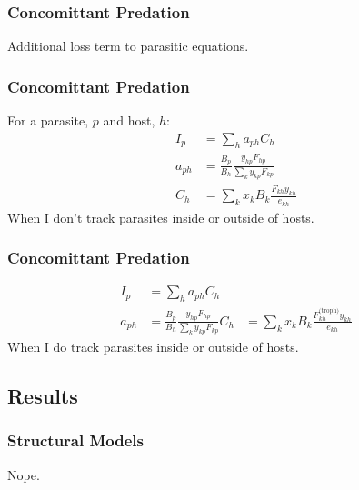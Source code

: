 \documentclass{beamer}
\begin{document}
\begin{frame}
\frametitle{Concomittant Predation}


Additional loss term to parasitic equations.

\end{frame}

\begin{frame}
\frametitle{Concomittant Predation}
For a parasite, $p$ and host, $h$:
\begin{align*}
I_p & = \sum_h a_{ph}C_h\\
a_{ph}& = \frac{B_p}{B_h}\frac{y_{hp}F_{hp}}{\sum_{k}y_{kp}F_{kp}}\\ 
C_h &= \sum_kx_kB_k\frac{F_{kh}y_{kh}}{e_{kh}} 
\end{align*}
When I don't track parasites inside or outside of hosts. 
\end{frame}

\begin{frame}
\frametitle{Concomittant Predation}
\begin{align*}
I_p & = \sum_h a_{ph}C_h\\
a_{ph} &= \frac{B_p}{B_h}\frac{y_{hp}F_{hp}}{\sum_{k}y_{kp}F_{kp}} \label{aph2}
C_h &= \sum_kx_kB_k\frac{F^\text{(troph)}_{kh}y_{kh}}{e_{kh}} 
\end{align*}
When I do track parasites inside or outside of hosts.
\end{frame}

\subsection{Results}

\begin{frame}
\frametitle{Structural Models}
Nope.
\end{frame}
\end{document}
